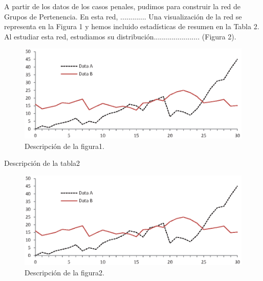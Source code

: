 A partir de los datos de los casos penales, pudimos
para construir la red de Grupos de Pertenencia. En esta red, ............. Una visualización de la red se representa en la
Figura 1 y hemos incluido estadísticas de resumen en la Tabla 2.
Al estudiar esta red, estudiamos su distribución.......................
(Figura 2). 

\begin{figure}
	\includegraphics[width=\textwidth]{fig1.eps}
	\caption{Descripción de la figura1.} \label{fig1}
\end{figure}

\begin{table}
	\caption{Descripción de la tabla2}\label{tab2}
\end{table}

\begin{figure}
	\includegraphics[width=\textwidth]{fig1.eps}
	\caption{Descripción de la figura2.} \label{fig2}
\end{figure}